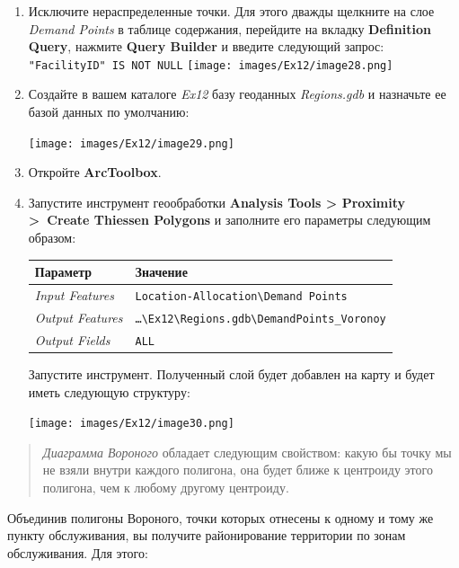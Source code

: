 \documentclass[12pt,]{book}
\begin{document}
\begin{enumerate}
\def\labelenumi{\arabic{enumi}.}
\item
  Исключите нераспределенные точки. Для этого дважды щелкните на слое \emph{Demand Points} в таблице содержания, перейдите на вкладку \textbf{Definition Query}, нажмите \textbf{Query Builder} и введите следующий запрос:
  \texttt{"FacilityID"\ IS\ NOT\ NULL}
  \texttt{[image: images/Ex12/image28.png]}
\item
  Создайте в вашем каталоге \emph{Ex12} базу геоданных \emph{Regions.gdb} и назначьте ее базой данных по умолчанию:

  \texttt{[image: images/Ex12/image29.png]}
\item
  Откройте \textbf{ArcToolbox}.
\item
  Запустите инструмент геообработки \textbf{Analysis Tools \textgreater{} Proximity \textgreater~Create Thiessen Polygons} и заполните его параметры следующим образом:

  \begin{longtable}[]{@{}ll@{}}
  \toprule
  Параметр & Значение\tabularnewline
  \midrule
  \endhead
  \emph{Input Features} & \texttt{Location-Allocation\textbackslash{}Demand\ Points}\tabularnewline
  \emph{Output Features} & \texttt{\ldots{}\textbackslash{}Ex12\textbackslash{}Regions.gdb\textbackslash{}DemandPoints\_Voronoy}\tabularnewline
  \emph{Output Fields} & \texttt{ALL}\tabularnewline
  \bottomrule
  \end{longtable}

  Запустите инструмент. Полученный слой будет добавлен на карту и будет иметь следующую структуру:

  \texttt{[image: images/Ex12/image30.png]}
\end{enumerate}

\begin{quote}
\emph{Диаграмма Вороного} обладает следующим свойством: какую бы точку мы не взяли внутри каждого полигона, она будет ближе к центроиду этого полигона, чем к любому другому центроиду.
\end{quote}

Объединив полигоны Вороного, точки которых отнесены к одному и тому же пункту обслуживания, вы получите районирование территории по зонам обслуживания. Для этого:
\end{document}
